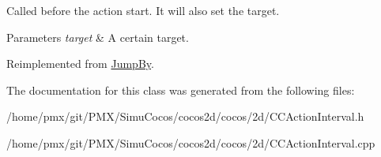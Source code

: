 Called before the action start. It will also set the target.


\begin{DoxyParams}{Parameters}
{\em target} & A certain target. \\
\hline
\end{DoxyParams}


Reimplemented from \hyperlink{classJumpBy_a3b05635b8834c6269b249dc1247854e9}{Jump\+By}.



The documentation for this class was generated from the following files\+:\begin{DoxyCompactItemize}
\item 
/home/pmx/git/\+P\+M\+X/\+Simu\+Cocos/cocos2d/cocos/2d/C\+C\+Action\+Interval.\+h\item 
/home/pmx/git/\+P\+M\+X/\+Simu\+Cocos/cocos2d/cocos/2d/C\+C\+Action\+Interval.\+cpp\end{DoxyCompactItemize}
